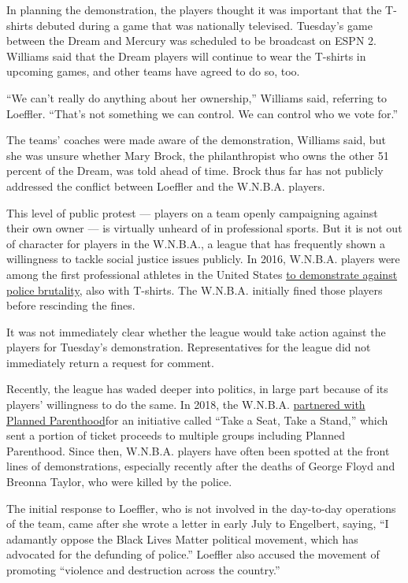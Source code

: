 In planning the demonstration, the players thought it was important that
the T-shirts debuted during a game that was nationally televised.
Tuesday's game between the Dream and Mercury was scheduled to be
broadcast on ESPN 2. Williams said that the Dream players will continue
to wear the T-shirts in upcoming games, and other teams have agreed to
do so, too.

``We can't really do anything about her ownership,'' Williams said,
referring to Loeffler. ``That's not something we can control. We can
control who we vote for.''

The teams' coaches were made aware of the demonstration, Williams said,
but she was unsure whether Mary Brock, the philanthropist who owns the
other 51 percent of the Dream, was told ahead of time. Brock thus far
has not publicly addressed the conflict between Loeffler and the
W.N.B.A. players.

This level of public protest --- players on a team openly campaigning
against their own owner --- is virtually unheard of in professional
sports. But it is not out of character for players in the W.N.B.A., a
league that has frequently shown a willingness to tackle social justice
issues publicly. In 2016, W.N.B.A. players were among the first
professional athletes in the United States
\href{https://www.nytimes.com/2016/07/11/sports/basketball/liberty-show-solidarity-with-black-lives-matter-in-rare-public-stance.html}{to
demonstrate against police brutality}, also with T-shirts. The W.N.B.A.
initially fined those players before rescinding the fines.

It was not immediately clear whether the league would take action
against the players for Tuesday's demonstration. Representatives for the
league did not immediately return a request for comment.

Recently, the league has waded deeper into politics, in large part
because of its players' willingness to do the same. In 2018, the
W.N.B.A.
\href{https://www.wnba.com/news/wnba-take-a-seat-take-a-stand-women-girls-2018-season/}{partnered
with Planned Parenthood}for an initiative called ``Take a Seat, Take a
Stand,'' which sent a portion of ticket proceeds to multiple groups
including Planned Parenthood. Since then, W.N.B.A. players have often
been spotted at the front lines of demonstrations, especially recently
after the deaths of George Floyd and Breonna Taylor, who were killed by
the police.

The initial response to Loeffler, who is not involved in the day-to-day
operations of the team, came after she wrote a letter in early July to
Engelbert, saying, ``I adamantly oppose the Black Lives Matter political
movement, which has advocated for the defunding of police.'' Loeffler
also accused the movement of promoting ``violence and destruction across
the country.''


